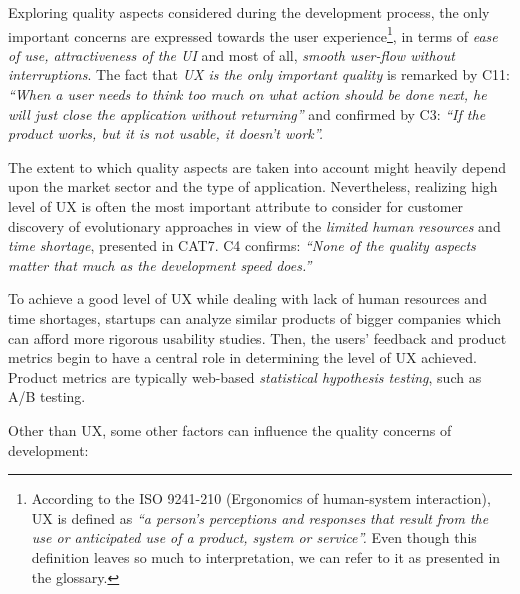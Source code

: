 \documentclass[10pt,journal,letterpaper,compsoc]{IEEEtran}
\begin{document}
Exploring quality aspects considered during the development process, the only 
important concerns are expressed towards the user experience\footnote{According 
to the ISO 9241-210 (Ergonomics of human-system interaction), UX is defined as 
\textit{``a person's perceptions and responses that result from the use or 
anticipated use of a product, system or service''.} Even though this definition 
leaves so much to interpretation, we can refer to it as presented in the 
glossary.}, in terms of \textit{ease of use, attractiveness of the UI} and most 
of all, \textit{smooth user-flow without interruptions}. The fact that 
\textit{UX is the only important quality} is remarked by C11: \textit{``When a 
user needs to think too much on what action should be done next, he will just 
close the application without returning''} and confirmed by C3: \textit{``If the 
product works, but it is not usable, it doesn't work''.}

The extent to which quality aspects are taken into account might heavily depend 
upon the market sector and the type of application. Nevertheless, realizing high 
level of UX  is often the most important attribute to consider for customer 
discovery of  evolutionary approaches in view of the \textit{limited human 
resources} and \textit{time shortage}, presented in CAT7. C4 confirms: 
\textit{``None of the quality aspects matter that much as the development speed 
does.''}

To achieve a good level of UX while dealing with lack of human resources and 
time shortages, startups can analyze similar products of bigger companies which 
can afford more rigorous usability studies. Then, the users' feedback and 
product metrics begin to have a central role in determining the level of UX 
achieved. Product metrics are typically web-based \textit{statistical hypothesis 
testing}, such as A/B testing. %

Other than UX, some other factors can influence the quality concerns of 
development:
\end{document}
